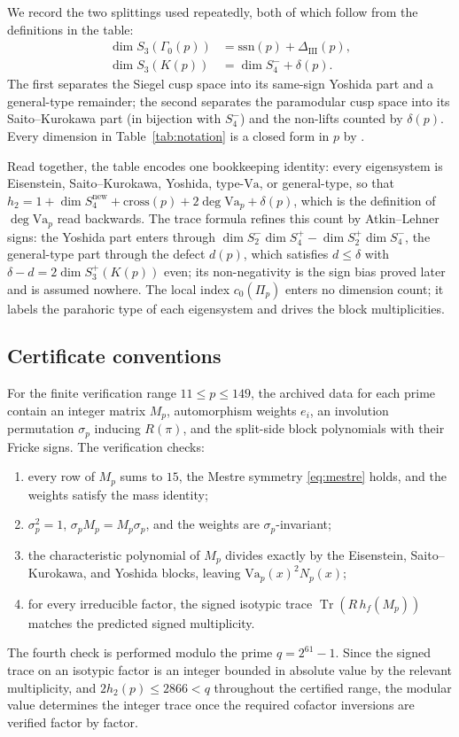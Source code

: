 \documentclass[11pt]{amsart}
\theoremstyle{plain}
\theoremstyle{definition}
\newcommand{\Va}{\mathrm{Va}}
\newcommand{\snew}{S^{\mathrm{new}}}
\providecommand{\Va}{\mathrm{Va}}
\providecommand{\snew}{S^{\mathrm{new}}}
\begin{document}
	We record the two splittings used repeatedly, both of which follow from the
	definitions in the table:
	\begin{align}
		\dim S_3(\Gamma_0(p)) &= \mathrm{ssn}(p)+\Delta_{\mathrm{III}}(p),\\
		\dim S_3(K(p)) &= \dim S_4^-+\delta(p).
	\end{align}
	The first separates the Siegel cusp space into its same-sign Yoshida part
	and a general-type remainder; the second separates the paramodular cusp
	space into its Saito--Kurokawa part (in bijection with $S_4^-$) and the
	non-lifts counted by $\delta(p)$. Every dimension in
	Table~\ref{tab:notation} is a closed form in $p$ by
	\cite{Ibukiyama2007dim,Ibukiyama-dim}.
	
	Read together, the table encodes one bookkeeping identity: every
	eigensystem is Eisenstein, Saito--Kurokawa, Yoshida, type-$\Va$, or
	general-type, so that
	$h_2=1+\dim\snew_4+\mathrm{cross}(p)+2\deg\Va_p+\delta(p)$, which is the
	definition of $\deg\Va_p$ read backwards. The trace formula refines this
	count by Atkin--Lehner signs: the Yoshida part enters through
	$\dim S_2^-\dim S_4^+-\dim S_2^+\dim S_4^-$, the general-type part through
	the defect $d(p)$, which satisfies $d\le\delta$ with
	$\delta-d=2\dim S_3^+(K(p))$ even; its non-negativity is the sign bias
	proved later and is assumed nowhere. The local index $c_0(\Pi_p)$ enters
	no dimension count; it labels the parahoric type of each eigensystem and
	drives the block multiplicities.
	
	\subsection{Certificate conventions}
	\label{ss:certificate-conventions}
	
	For the finite verification range $11\le p\le149$, the archived data for
	each prime contain an integer matrix $M_p$, automorphism weights $e_i$, an
	involution permutation $\sigma_p$ inducing $R(\pi)$, and the split-side
	block polynomials with their Fricke signs. The verification checks:
	\begin{enumerate}[label=\textup{(Cert\arabic*)},leftmargin=3.7em]
		\item every row of $M_p$ sums to $15$, the Mestre symmetry
		\eqref{eq:mestre} holds, and the weights satisfy the mass identity;
		\item $\sigma_p^2=1$, $\sigma_pM_p=M_p\sigma_p$, and the weights are
		$\sigma_p$-invariant;
		\item the characteristic polynomial of $M_p$ divides exactly by the
		Eisenstein, Saito--Kurokawa, and Yoshida blocks, leaving
		$\Va_p(x)^2N_p(x)$;
		\item for every irreducible factor, the signed isotypic trace
		$\operatorname{Tr}(R\,h_f(M_p))$ matches the predicted signed multiplicity.
	\end{enumerate}
	The fourth check is performed modulo the prime $q=2^{61}-1$. Since the
	signed trace on an isotypic factor is an integer bounded in absolute value
	by the relevant multiplicity, and $2h_2(p)\le2866<q$ throughout the
	certified range, the modular value determines the integer trace once the
	required cofactor inversions are verified factor by factor.
	
\end{document}
